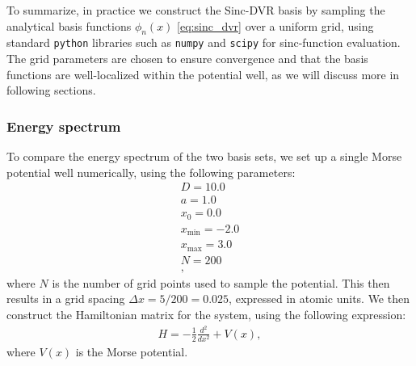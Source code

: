 \documentclass{subfiles}
\begin{document}
To summarize, in practice we construct the Sinc-DVR basis by sampling the analytical basis functions $\phi_n(x)$ \eqref{eq:sinc_dvr} over a uniform grid, using standard \texttt{python} libraries such as \texttt{numpy} and \texttt{scipy} for sinc-function evaluation. The grid parameters are chosen to ensure convergence and that the basis functions are well-localized within the potential well, as we will discuss more in following sections. 
\subsubsection*{Energy spectrum} 
To compare the energy spectrum of the two basis sets, we set up a single Morse potential well numerically, using the following parameters:
\begin{align*}
    D = 10.0 \\
    a = 1.0 \\
    x_0 = 0.0 \\
    x_{\text{min}} = -2.0 \\
    x_{\text{max}} = 3.0 \\
    N = 200 \\,
\end{align*}
where $N$ is the number of grid points used to sample the potential. This then results in a grid spacing $\Delta x = 5 / 200 = 0.025$, expressed in atomic units. We then construct the Hamiltonian matrix for the system, using the following expression:
\begin{align*}
    H = -\frac{1}{2} \frac{d^2}{dx^2} + V(x),
\end{align*}
where $V(x)$ is the Morse potential. 
\end{document}
